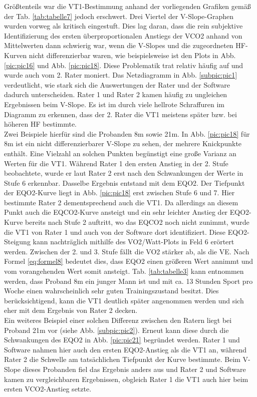Größtenteils war die VT1-Bestimmung anhand der vorliegenden Grafiken gemäß der Tab. \ref{tab:tabelle7} jedoch erschwert. Drei Viertel der V-Slope-Graphen wurden vorweg als kritisch eingestuft. Dies lag daran, dass die rein subjektive Identifizierung des ersten überproportionalen Anstiegs der \acs{VCO2} anhand von Mittelwerten dann schwierig war, wenn die V-Slopes und die zugeordneten \acs{HF}-Kurven nicht differenzierbar waren, wie beispielsweise ist den Plots in Abb. \ref{pic:pic16} und Abb. \ref{pic:pic18}. Diese Problematik trat relativ häufig auf und wurde auch vom 2. Rater moniert. Das Netzdiagramm in Abb. \ref{subpic:pic1} verdeutlicht, wie stark sich die Auswertungen der Rater und der Software dadurch unterscheiden. Rater 1 und Rater 2 kamen häufig zu ungleichen Ergebnissen beim V-Slope. Es ist im durch viele hellrote Schraffuren im Diagramm zu erkennen, dass der 2. Rater die VT1 meistens später bzw. bei höheren \acs{HF} bestimmte.\\
Zwei Beispiele hierfür sind die Probanden 8m sowie 21m. In Abb. \ref{pic:pic18} für 8m ist ein nicht differenzierbarer V-Slope zu sehen, der mehrere Knickpunkte enthält. Eine Vielzahl an solchen Punkten begünstigt eine große Varianz an Werten für die VT1. Während Rater 1 den ersten Anstieg in der 2. Stufe beobachtete, wurde er laut Rater 2 erst nach den Schwankungen der Werte in Stufe 6 erkennbar. Dasselbe Ergebnis entstand mit dem \acs{EQO2}. Der Tiefpunkt der \acs{EQO2}-Kurve liegt in Abb. \ref{pic:pic18} erst zwischen Stufe 6 und 7. Hier bestimmte Rater 2 dementsprechend auch die VT1. Da allerdings an diesem Punkt auch die \acs{EQCO2}-Kurve ansteigt und ein sehr leichter Anstieg der \acs{EQO2}-Kurve bereits nach Stufe 2 auftritt, wo das \acs{EQCO2} noch nicht zunimmt, wurde die VT1 von Rater 1 und auch von der Software dort identifiziert. Diese \acs{EQO2}-Steigung kann nachträglich mithilfe des \acs{VO2}/Watt-Plots in Feld 6 erörtert werden. Zwischen der 2. und 3. Stufe fällt die \acs{VO2} stärker ab, als die \acs{VE}. Nach Formel \eqref{eq:formel8} bedeutet dies, dass \acs{EQO2} einen größeren Wert annimmt und vom vorangehenden Wert somit ansteigt. Tab. \ref{tab:tabelle3} kann entnommen werden, dass Proband 8m ein junger Mann ist und mit ca. 13 Stunden Sport pro Woche einen wahrscheinlich sehr guten Trainingszustand besitzt. Dies berücksichtigend, kann die VT1 deutlich später angenommen werden und sich eher mit dem Ergebnis von Rater 2 decken.\\
Ein weiteres Beispiel einer solchen Differenz zwischen den Ratern liegt bei Proband 21m vor (siehe Abb. \ref{subpic:pic2}). Erneut kann diese durch die Schwankungen des \acs{EQO2} in Abb. \ref{pic:pic21} begründet werden. Rater 1 und Software nahmen hier auch den ersten \acs{EQO2}-Anstieg als die VT1 an, während Rater 2 die Schwelle am tatsächlichen Tiefpunkt der Kurve bestimmte. Beim V-Slope dieses Probanden fiel das Ergebnis anders aus und Rater 2 und Software kamen zu vergleichbaren Ergebnissen, obgleich Rater 1 die VT1 auch hier beim ersten \acs{VCO2}-Anstieg setzte.\\

